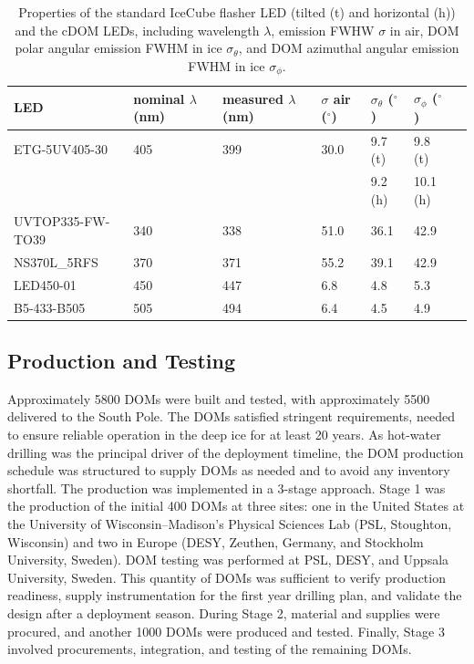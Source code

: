 \begin{table}
\caption{Properties of the standard IceCube flasher LED (tilted (t)
  and horizontal (h)) and the cDOM LEDs, including wavelength $\lambda$,
  emission FWHW $\sigma$ in air, DOM polar
  angular emission FWHM in ice $\sigma_{\theta}$, and DOM azimuthal angular emission
  FWHM in ice $\sigma_{\phi}$.}
\begin{tabularx}{\linewidth}{lXXXXXX}
\toprule
 LED& nominal $\lambda$ (nm) & measured $\lambda$ (nm) & $\sigma$ air ($^{\circ}$) &
 $\sigma_{\theta}$ ($^{\circ}$) & $\sigma_{\phi}$ ($^{\circ}$)\\
\midrule
ETG-5UV405-30 & 405 & 399 & 30.0 & 9.7 (t)& 9.8 (t) \\
 &  &  &  & 9.2 (h)& 10.1 (h)\\
UVTOP335-FW-TO39 & 340 & 338 & 51.0 & 36.1 & 42.9 \\
NS370L\_5RFS & 370 & 371 & 55.2 & 39.1 & 42.9 \\
LED450-01 & 450 & 447 &	6.8 & 4.8 &	5.3 \\
B5-433-B505 & 505 & 494 & 6.4 &	4.5 & 4.9 \\
\bottomrule
\end{tabularx}
\label{table:cdom_properties}
\end{table}

\subsection{\label{sec:dom_prodtest}Production and Testing}

Approximately 5800 DOMs were built and tested, with
approximately 5500 delivered to the South Pole. The DOMs satisfied
stringent requirements, needed to ensure reliable operation in the deep ice
for at least 20 years. As hot-water drilling was the principal 
driver of the deployment timeline, the DOM production schedule was
structured to supply DOMs as needed and to avoid any inventory shortfall.
The production was implemented in a 3-stage approach. Stage 1 was
the production of the initial 400 DOMs at three sites: one in the
United States at the University of Wisconsin--Madison's Physical
Sciences Lab (PSL, Stoughton, Wisconsin) and two
in Europe (DESY, Zeuthen, Germany, and Stockholm University,
Sweden). DOM testing was performed at PSL, DESY, and Uppsala University,
Sweden. This
quantity of DOMs was sufficient to verify production readiness, supply
instrumentation for the first year drilling plan, and validate the design after a deployment
season.  During Stage 2, material and supplies were procured, and another
1000 DOMs were produced and tested. Finally, Stage 3 involved procurements,
integration, and testing of the remaining DOMs.


